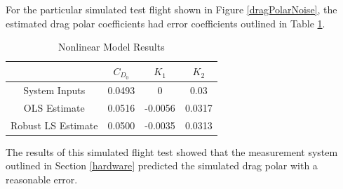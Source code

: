 For the particular simulated test flight shown in Figure \ref{dragPolarNoise}, the estimated drag polar coefficients had error coefficients outlined in Table \ref{simCoeffErrorTable}.

\begin{table}[ht]
\caption{Nonlinear Model Results} %
\centering %
\begin{tabular}{c c c c} %
\hline\hline %
 & $C_{D_0}$ & $K_1$ & $K_2$ \\ [0.5ex] %
\hline %
System Inputs & 0.0493 & 0 & 0.03 \\ %
OLS Estimate & 0.0516 & -0.0056 & 0.0317 \\
Robust LS Estimate & 0.0500 & -0.0035 & 0.0313 \\ [1ex] %
\hline %
\end{tabular}
\label{simCoeffErrorTable} %
\end{table}

The results of this simulated flight test showed that the measurement system outlined in Section \ref{hardware} predicted the simulated drag polar with a reasonable error.
